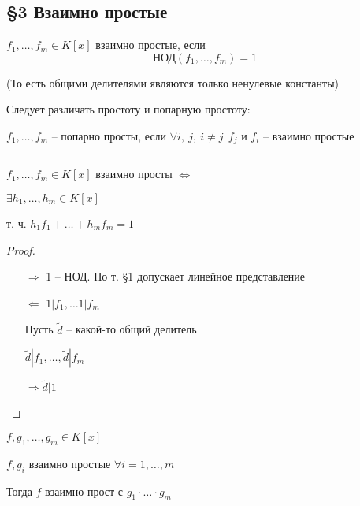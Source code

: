     \subsection*{\S3 Взаимно простые}

    \begin{definition}
        $f_1, \dots, f_m \in K[x]$ взаимно простые, если
        \[
            \text{НОД}(f_1, \dots, f_m) = 1    
        \]
        \par (То есть общими делителями являются только ненулевые константы)
    \end{definition}

    \begin{remark}
        Следует различать простоту и попарную простоту:
        \par $f_1, \dots, f_m$ -- попарно просты, если $\forall i, \ j, \ i \not= j \ \ f_j$ и $f_i$ -- взаимно простые
    \end{remark}

    \begin{theorem}
        $ $
        \par \quad $f_1, \dots, f_m \in K[x]$ взаимно просты $\Leftrightarrow$
        \par \quad $\exists h_1, \dots, h_m \in K[x]$
        \par \quad т. ч. $h_1 f_1 + \dots + h_m f_m = 1$
    \end{theorem}

    \begin{proof}
        $ $
        \begin{enumerate}
            \item[$\Rightarrow$] 1 -- НОД. По т. \S1 допускает линейное представление
            \item[$\Leftarrow$] $1 | f_1, \dots 1 | f_m$
            \par Пусть $\tilde d$ -- какой-то общий делитель
            \par $\tilde d | f_1, \dots, \tilde d | f_m$
            \par $\Rightarrow \tilde d | 1$
        \end{enumerate}
    \end{proof}

    \begin{theorem}
        $f, g_1, \dots, g_m \in K[x]$
        \par $f, g_i$ взаимно простые $\forall i = 1, \dots, m$
        \par Тогда $f$ взаимно прост с $g_1 \cdot \ldots \cdot g_m$ %
    \end{theorem}


